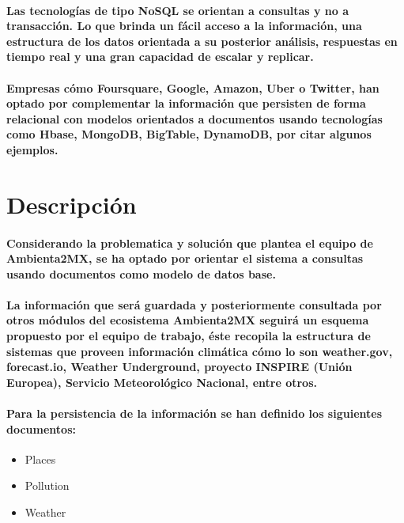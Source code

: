 \paragraph{Las tecnologías de tipo NoSQL se orientan a consultas y no a transacción. Lo que brinda un fácil acceso a la información, una estructura de los datos orientada a su posterior análisis, respuestas en tiempo real y una gran capacidad de escalar y replicar. \cite{10}}

\paragraph{Empresas cómo Foursquare, Google, Amazon, Uber o Twitter, han optado por complementar la información que persisten de forma relacional con modelos orientados a documentos usando tecnologías como Hbase, MongoDB, BigTable, DynamoDB, por citar algunos ejemplos. \cite{11} \cite{12} }

\section{Descripción}
\paragraph{Considerando la problematica y solución que plantea el equipo de Ambienta2MX, se ha optado por orientar el sistema a consultas usando documentos como modelo de datos base. }

\paragraph{La información que será guardada y posteriormente consultada por otros módulos del ecosistema Ambienta2MX seguirá un esquema propuesto por el equipo de trabajo, éste recopila la estructura de sistemas que proveen información climática cómo lo son weather.gov, forecast.io, Weather Underground, proyecto INSPIRE (Unión Europea), Servicio Meteorológico Nacional, entre otros. \cite{13} \cite{14} \cite{15} }

\paragraph{Para la persistencia de la información se han definido los siguientes documentos:}
\begin{itemize}
  \item Places
  \item Pollution
  \item Weather  
\end{itemize}

